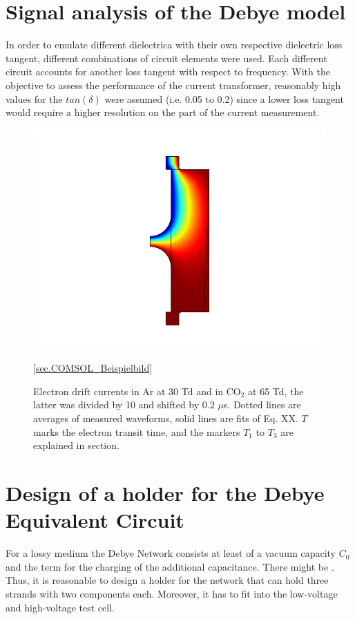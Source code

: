 	

\section{Signal analysis of the Debye model}

In order to emulate different dielectrica with their own respective dielectric loss tangent, different combinations of circuit elements were used. Each different circuit accounts for another loss tangent with respect to frequency. With the objective to assess the performance of the current transformer, reasonably high values for the $tan\left(\delta\right)$ were assumed (i.e. 0.05 to 0.2) since a lower loss tangent would require a higher resolution on the part of the current measurement.


\begin{figure}[htbp]
	\centering
	\includegraphics{figures/COMSOL_Beispielbild.jpg}		
	\caption[Kurze Abbildungsbeschreibung]{Electron drift currents in Ar at 30 Td and in CO$_2$ at 65 Td, the latter was divided by 10 and shifted by 0.2 $\mu$s. Dotted lines are averages of measured waveforms, solid lines are fits of Eq. XX. $T$ marks the electron transit time, and the markers $T_1$ to $T_3$ are explained in section.} \ref{sec.COMSOL_Beispielbild}
	\label{fig.waveforms}
\end{figure}


\section{Design of a holder for the Debye Equivalent Circuit}
For a lossy medium the Debye Network consists at least of a vacuum capacity $C_0$ and the term for the charging of the additional capacitance. There might be . Thus, it is reasonable to design a holder for the network that can hold three strands with two components each. Moreover, it has to fit into the low-voltage and high-voltage test cell. 

